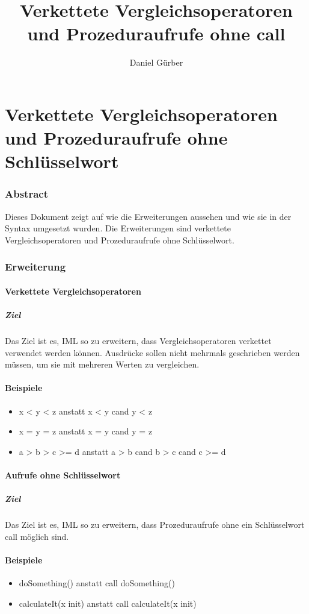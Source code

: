 \documentclass[a4paper,10pt]{article}
\title{Verkettete Vergleichsoperatoren und Prozeduraufrufe ohne call}
\author{Daniel G\"urber}
\begin{document}
\part*{Verkettete Vergleichsoperatoren und Prozeduraufrufe ohne Schl\"usselwort}
\section{Abstract}
Dieses Dokument zeigt auf wie die Erweiterungen aussehen und
wie sie in der Syntax umgesetzt wurden. Die Erweiterungen
sind verkettete Vergleichsoperatoren und Prozeduraufrufe ohne Schl\"usselwort.
\section{Erweiterung}
\subsection{Verkettete Vergleichsoperatoren}
\subsubsection{Ziel}
Das Ziel ist es, IML so zu erweitern, dass Vergleichsoperatoren verkettet verwendet werden k\"onnen. Ausdr\"ucke sollen nicht mehrmals
geschrieben werden m\"ussen, um sie mit mehreren Werten zu vergleichen.
\subsection{Beispiele}
\begin{itemize}
\item x < y < z anstatt x < y cand y < z
\item x = y = z anstatt x = y cand y = z
\item a > b > c >= d anstatt a > b cand b > c cand c >= d
\end{itemize}
\subsection{Aufrufe ohne Schl\"usselwort}
\subsubsection{Ziel}
Das Ziel ist es, IML so zu erweitern, dass Prozeduraufrufe ohne ein
Schl\"usselwort call m\"oglich sind.
\subsection{Beispiele}
\begin{itemize}
\item doSomething() anstatt call doSomething()
\item calculateIt(x init) anstatt call calculateIt(x init)
\end{itemize}
\end{document}
